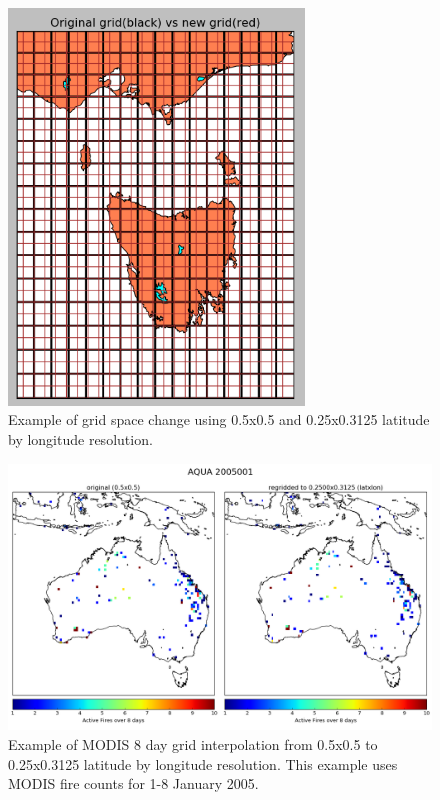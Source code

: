     \begin{figure}[!htbp]\begin{center}
      \includegraphics[width=0.7\textwidth]{Figures/MODIS_grid_space.png}
      \caption{Example of grid space change using 0.5x0.5 and 0.25x0.3125 latitude by longitude resolution.}
      \label{ch_HCHO:fig:modisgridspace}
    \end{center}\end{figure}
    
    \begin{figure}[!htbp]\begin{center}
      \includegraphics[width=\textwidth]{Figures/MODIS_Regrid_Comparison.png}
      \caption{Example of MODIS 8 day grid interpolation from 0.5x0.5 to 0.25x0.3125 latitude by longitude resolution.
      This example uses MODIS fire counts for 1-8 January 2005.}
      \label{ch_HCHO:fig:modisinterpolation}
    \end{center}\end{figure}
    
